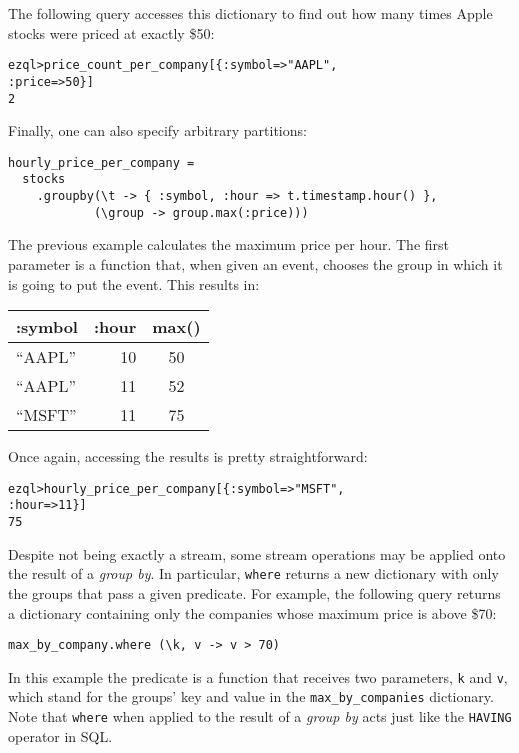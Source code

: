 \documentclass{report}
\newenvironment{evaluation}
{
  \framed
  \begin{alltt}
}
{
  \end{alltt}
  \endframed
}
\begin{document}
The following query accesses this dictionary to find out how many
times Apple stocks were priced at exactly \$50:

\begin{evaluation}
  ezql> price_count_per_company[\{ :symbol => "AAPL",
                                  :price => 50 \}]
  2
\end{evaluation}

Finally, one can also specify arbitrary partitions:

\begin{verbatim}
hourly_price_per_company =
  stocks
    .groupby(\t -> { :symbol, :hour => t.timestamp.hour() },
            (\group -> group.max(:price)))
\end{verbatim}

The previous example calculates the maximum price per hour. The first
parameter is a function that, when given an event, chooses the group
in which it is going to put the event. This results in:

\begin{tabular}{ |l|r|c| }
  \hline
  :symbol & :hour & max() \\
  \hline
  ``AAPL'' & 10 & 50 \\
  ``AAPL'' & 11 & 52 \\
  ``MSFT'' & 11 & 75 \\
  \hline
\end{tabular}

Once again, accessing the results is pretty straightforward:

\begin{evaluation}
ezql> hourly_price_per_company[\{ :symbol => "MSFT",
                                 :hour   => 11 \}]
75
\end{evaluation}

Despite not being exactly a stream, some stream operations may be
applied onto the result of a \emph{group by}. In particular,
\verb=where= returns a new dictionary with only the groups that pass a
given predicate. For example, the following query returns a dictionary
containing only the companies whose maximum price is above \$70:

\begin{verbatim}
max_by_company.where (\k, v -> v > 70)
\end{verbatim}

In this example the predicate is a function that receives two
parameters, \verb=k= and \verb=v=, which stand for the groups' key and
value in the \verb=max_by_companies= dictionary. Note that
\verb=where= when applied to the result of a \emph{group by} acts just
like the \verb=HAVING= operator in SQL.
\end{document}
